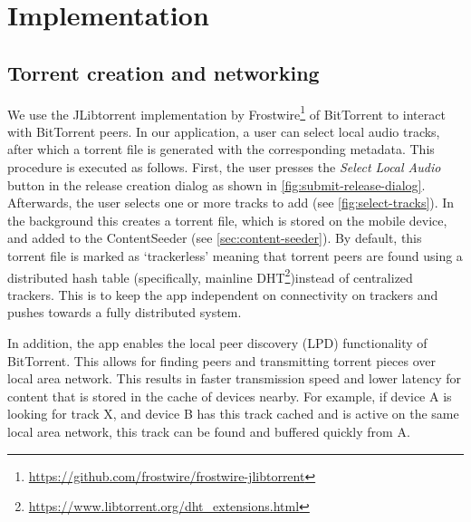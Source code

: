 \chapter{Implementation}
\section{Torrent creation and networking}
We use the JLibtorrent implementation by Frostwire\footnote{\url{https://github.com/frostwire/frostwire-jlibtorrent}} of BitTorrent to interact with BitTorrent peers. In our application, a user can select local audio tracks, after which a torrent file is generated with the corresponding metadata. This procedure is executed as follows. First, the user presses the \textit{Select Local Audio} button in the release creation dialog as shown in \ref{fig:submit-release-dialog}. Afterwards, the user selects one or more tracks to add (see \ref{fig:select-tracks}). In the background this creates a torrent file, which is stored on the mobile device, and added to the ContentSeeder (see \ref{sec:content-seeder}). By default, this torrent file is marked as `trackerless' meaning that torrent peers are found using a distributed hash table\cite{dht2019} (specifically, mainline DHT\footnote{\url{https://www.libtorrent.org/dht_extensions.html}})instead of centralized trackers. This is to keep the app independent on connectivity on trackers and pushes towards a fully distributed system.

In addition, the app enables the local peer discovery (LPD)\cite{bittorrentbep142015} functionality of BitTorrent. This allows for finding peers and transmitting torrent pieces over local area network. This results in faster transmission speed and lower latency for content that is stored in the cache of devices nearby. For example, if device A is looking for track X, and device B has this track cached and is active on the same local area network, this track can be found and buffered quickly from A.
